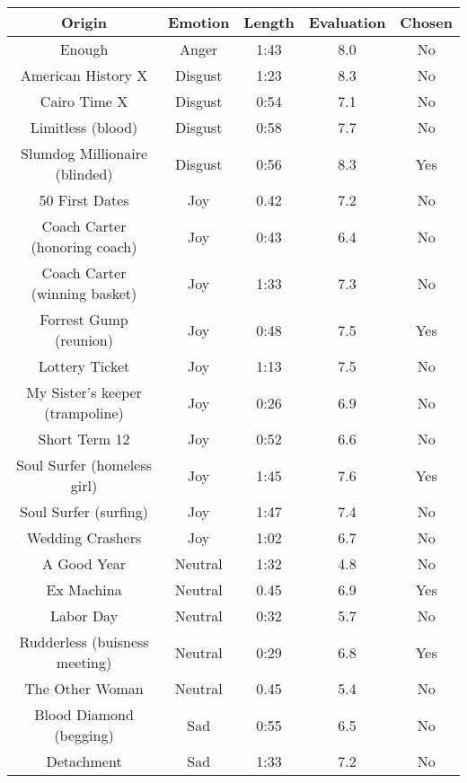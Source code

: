 \begin{table}[]
    \centering
    \begin{tabular}{|c|c|c|c|c|}
        \hline
         Origin & Emotion & Length & Evaluation & Chosen  \\ \hline
          Enough & Anger & 1:43 & 8.0  & No \\ \hline
          American History X & Disgust & 1:23 & 8.3  & No \\ \hline
          Cairo Time X & Disgust & 0:54 & 7.1  & No \\ \hline
          Limitless (blood) & Disgust & 0:58 & 7.7  & No \\ \hline
          Slumdog Millionaire (blinded) & Disgust & 0:56 & 8.3  & Yes\\ \hline
          50 First Dates & Joy & 0.42 & 7.2  & No \\ \hline
          Coach Carter (honoring coach) & Joy & 0:43 & 6.4  & No \\ \hline
          Coach Carter (winning basket) & Joy & 1:33 & 7.3  & No \\ \hline
          Forrest Gump (reunion) & Joy & 0:48 & 7.5  & Yes \\ \hline
          Lottery Ticket & Joy & 1:13 & 7.5  & No \\ \hline
          My Sister's keeper (trampoline) & Joy & 0:26 & 6.9  & No \\ \hline
          Short Term 12 & Joy & 0:52 & 6.6  & No \\ \hline
          Soul Surfer (homeless girl) & Joy & 1:45 & 7.6  & Yes \\ \hline
          Soul Surfer (surfing) & Joy & 1:47 & 7.4  & No \\ \hline
          Wedding Crashers & Joy & 1:02 & 6.7  & No \\ \hline
          A Good Year & Neutral & 1:32 & 4.8  & No \\ \hline
          Ex Machina & Neutral & 0.45 & 6.9  & Yes \\ \hline
          Labor Day & Neutral & 0:32 & 5.7  & No \\ \hline
          Rudderless (buisness meeting) & Neutral & 0:29 & 6.8  & Yes \\ \hline
          The Other Woman & Neutral & 0.45 & 5.4  & No \\ \hline
          Blood Diamond (begging) & Sad & 0:55 & 6.5  & No \\ \hline
          Detachment & Sad & 1:33 & 7.2  & No \\ \hline

\end{tabular}
\end{table}
